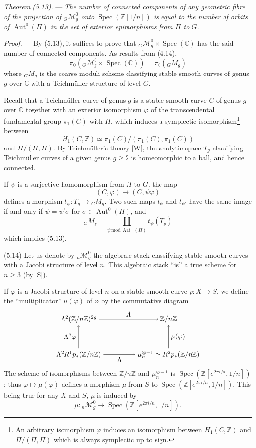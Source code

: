\documentclass[10pt]{article}
\newcommand{\Spec}{\operatorname{Spec}}
\newcommand{\Aut}{\operatorname{Aut}}
\begin{document}
\medskip
\noindent\emph{Theorem (5.13).} --- \emph{The number of connected components of any geometric fibre of the projection of ${}_G\mathcal M_g^0$ onto $\Spec(\mathbb Z[1/n])$ is equal to the number of orbits of $\Aut^0(\Pi)$ in the set of exterior epimorphisms from $\Pi$ to $G$.}

\noindent\emph{Proof.} --- By (5.13), it suffices to prove that ${}_G\mathcal M_g^0\times\Spec(\mathbb C)$ has the said number of connected components. As results from (4.14),
\[
\pi_0({}_G\mathcal M_g^0\times\Spec(\mathbb C))=\pi_0({}_GM_g)
\]
where ${}_GM_g$ is the coarse moduli scheme classifying stable smooth curves of genus $g$ over $\mathbb C$ with a Teichmüller structure of level $G$.

Recall that a Teichmüller curve of genus $g$ is a stable smooth curve $C$ of genus $g$ over $\mathbb C$ together with an exterior isomorphism $\varphi$ of the transcendental fundamental group $\pi_1(C)$ with $\Pi$, which induces a symplectic isomorphism\footnote{An arbitrary isomorphism $\varphi$ induces an isomorphism between $H_1(C,\mathbb Z)$ and $\Pi/(\Pi,\Pi)$ which is always symplectic up to sign.} between
\[
H_1(C,\mathbb Z)\simeq \pi_1(C)/(\pi_1(C),\pi_1(C))
\]
and $\Pi/(\Pi,\Pi)$. By Teichmüller's theory [W], the analytic space $T_g$ classifying Teichmüller curves of a given genus $g\geq2$ is homeomorphic to a ball, and hence connected.

If $\psi$ is a surjective homomorphism from $\Pi$ to $G$, the map
\[
(C,\varphi)\longmapsto (C,\psi\varphi)
\]
defines a morphism $t_\psi:T_g\to{}_GM_g$. Two such maps $t_\psi$ and $t_{\psi'}$ have the same image if and only if $\psi=\psi'\sigma$ for $\sigma\in\Aut^0(\Pi)$, and
\[
{}_GM_g=\coprod_{\psi\,\mathrm{mod}\,\Aut^0(\Pi)} t_\psi(T_g)
\]
which implies (5.13).

\medskip
\noindent(5.14) Let us denote by ${}_n\mathcal M_g^0$ the algebraic stack classifying stable smooth curves with a Jacobi structure of level $n$. This algebraic stack ``is'' a true scheme for $n\geq3$ (by [S]).

If $\varphi$ is a Jacobi structure of level $n$ on a stable smooth curve $p:X\to S$, we define the ``multiplicator'' $\mu(\varphi)$ of $\varphi$ by the commutative diagram
\[
\begin{tikzpicture}[baseline=(current bounding box.center)]
\node (A) at (0,1.8) {$\Lambda^2(\mathbb Z/n\mathbb Z)^{2g}$};
\node (B) at (4.6,1.8) {$\mathbb Z/n\mathbb Z$};
\node (C) at (0,0) {$\Lambda^2R^1p_*(\mathbb Z/n\mathbb Z)$};
\node (D) at (4.6,0) {$\mu_n^{\otimes -1}\simeq R^2p_*(\mathbb Z/n\mathbb Z)$};
\draw[->] (A) -- node[above] {$A$} (B);
\draw[->] (C) -- node[below] {$\Lambda$} (D);
\draw[->] (C) -- node[left] {$\Lambda^2\varphi$} (A);
\draw[->] (D) -- node[right] {$\mu(\varphi)$} (B);
\end{tikzpicture}
\]
The scheme of isomorphisms between $\mathbb Z/n\mathbb Z$ and $\mu_n^{\otimes -1}$ is $\Spec(\mathbb Z[e^{2\pi i/n},1/n])$; thus $\varphi\mapsto\mu(\varphi)$ defines a morphism $\mu$ from $S$ to $\Spec(\mathbb Z[e^{2\pi i/n},1/n])$. This being true for any $X$ and $S$, $\mu$ is induced by
\[
\mu:{}_n\mathcal M_g^0\longrightarrow \Spec(\mathbb Z[e^{2\pi i/n},1/n]).
\]
\end{document}
